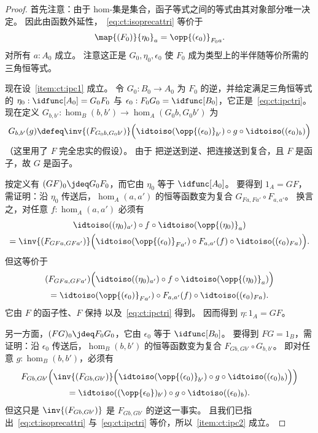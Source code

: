 \begin{proof}
  首先注意：由于 hom-集是集合，函子等式之间的等式由其对象部分唯一决定。
  因此由函数外延性，~\eqref{eq:ct:isoprecattri} 等价于
  \begin{equation}
    \map{(F_0)}{\eta_0}_a = \opp{(\epsilon_0)}_{F_0 a}.\label{eq:ct:ipctri}
  \end{equation}
  对所有 $a:A_0$ 成立。
  注意这正是 $G_0,\eta_0,\epsilon_0$ 使 $F_0$ 成为类型上的半伴随等价所需的三角恒等式。

  现在设~\ref{item:ct:ipc1} 成立。
  令 $G_0:B_0 \to A_0$ 为 $F_0$ 的逆，并给定满足三角恒等式的 $\eta_0: \idfunc[A_0] = G_0 F_0$ 与 $\epsilon_0:F_0G_0 = \idfunc[B_0]$，它正是~\eqref{eq:ct:ipctri}。
  现在定义 $G_{b,b'}:\hom_B(b,b') \to \hom_A(G_0b,G_0b')$ 为
  \[ G_{b,b'}(g) \defeq
  \inv{(F_{G_0b,G_0b'})}\Big(\idtoiso(\opp{(\epsilon_0)}_{b'}) \circ g \circ \idtoiso((\epsilon_0)_b)\Big)
  \]
  （这里用了 $F$ 完全忠实的假设）。
  由于 \idtoiso 把逆送到逆、把连接送到复合，且 $F$ 是函子，故 $G$ 是函子。

  按定义有 $(GF)_0 \jdeq G_0 F_0$，而它由 $\eta_0$ 等于 $\idfunc[A_0]$。
  要得到 $1_A = GF$，需证明：沿 $\eta_0$ 传送后，$\hom_A(a,a')$ 的恒等函数变为复合 $G_{Fa,Fa'} \circ F_{a,a'}$。
  换言之，对任意 $f:\hom_A(a,a')$ 必须有
  \begin{multline*}
    \idtoiso((\eta_0)_{a'}) \circ f \circ \idtoiso(\opp{(\eta_0)}_a)\\
    = \inv{(F_{GFa,GFa'})}\Big(\idtoiso(\opp{(\epsilon_0)}_{Fa'})
    \circ F_{a,a'}(f) \circ \idtoiso((\epsilon_0)_{Fa})\Big).
  \end{multline*}
  但这等价于
  \begin{multline*}
    (F_{GFa,GFa'})\Big(\idtoiso((\eta_0)_{a'}) \circ f \circ \idtoiso(\opp{(\eta_0)}_a)\Big)\\
    = \idtoiso(\opp{(\epsilon_0)}_{Fa'})
    \circ F_{a,a'}(f) \circ \idtoiso((\epsilon_0)_{Fa}).
  \end{multline*}
  它由 $F$ 的函子性、$F$ 保持 \idtoiso 以及~\eqref{eq:ct:ipctri} 得到。
  因而得到 $\eta:1_A = GF$。

  另一方面，$(FG)_0\jdeq F_0 G_0$，它由 $\epsilon_0$ 等于 $\idfunc[B_0]$。
  要得到 $FG=1_B$，需证明：沿 $\epsilon_0$ 传送后，$\hom_B(b,b')$ 的恒等函数变为复合 $F_{Gb,Gb'} \circ G_{b,b'}$。
  即对任意 $g:\hom_B(b,b')$，必须有
  \begin{multline*}
    F_{Gb,Gb'}\Big(\inv{(F_{Gb,Gb'})}\Big(\idtoiso(\opp{(\epsilon_0)}_{b'}) \circ g \circ \idtoiso((\epsilon_0)_b)\Big)\Big)\\
    = \idtoiso((\opp{\epsilon_0})_{b'}) \circ g \circ \idtoiso((\epsilon_0)_b).
  \end{multline*}
  但这只是 $\inv{(F_{Gb,Gb'})}$ 是 $F_{Gb,Gb'}$ 的逆这一事实。
  且我们已指出~\eqref{eq:ct:isoprecattri} 与~\eqref{eq:ct:ipctri} 等价，所以~\ref{item:ct:ipc2} 成立。


\end{proof}
